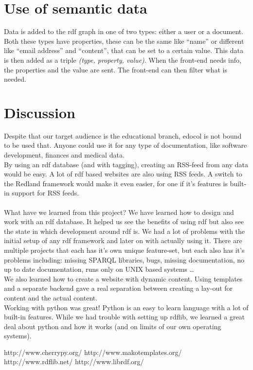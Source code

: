 \documentclass[12pt,a4paper]{article}
\begin{document}
  \section{Use of semantic data}
    Data is added to the rdf graph in one of two types: either a user or a document.
    Both these types have properties, these can be the same like ``name'' or different 
    like ``email address'' and ``content'', that can be set to a certain value. 
    This data is then added as a triple \emph{(type, property, value)}. When the 
    front-end needs info, the properties and the value are sent. The front-end 
    can then filter what is needed.
    
  \section{Discussion}
    Despite that our target audience is the educational branch, edocol is not bound
    to be used that. Anyone could use it for any type of documentation, like software
    development, finances and medical data.\\
    By using an rdf database (and with tagging), creating an RSS-feed from any
    data would be easy. A lot of rdf based websites are also using RSS feeds. A
    switch to the Redland framework would make it even easier, for one if it's features
    is built-in support for RSS feeds.\\ \\
    What have we learned from this project? We have learned how to design and work
    with an rdf database. It helped us see the benefits of using rdf but also see
    the state in which development around rdf is. We had a lot of problems with the
    initial setup of any rdf framework and later on with actually using it. There 
    are multiple projects that each has it's own unique feature-set, but each also
    has it's problems including: missing SPARQL libraries, bugs, missing documentation,
    no up to date documentation, runs only on UNIX based systems \ldots \\
    We also learned how to create a website with dynamic content. Using templates 
    and a separate backend gave a real separation between creating a lay-out for content
    and the actual content. \\
    Working with python was great! Python is an easy to learn language with a lot of built-in
    features. While we had trouble with setting up rdflib, we learned a great deal 
    about python and how it works (and on limits of our own operating systems).
    

	
	

\begin{thebibliography}{}
    http://www.cherrypy.org/
    http://www.makotemplates.org/
    http://www.rdflib.net/
    http://www.librdf.org/
\end{thebibliography}
	
\end{document}
